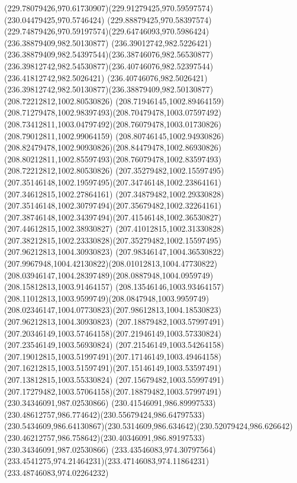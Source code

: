 {    \curveto(229.78079426,970.61730907)(229.91279425,970.59597574)(230.04479425,970.5746424)
    \curveto(229.88879425,970.58397574)(229.74879426,970.59197574)(229.64746093,970.5986424)
    \moveto(236.38879409,982.50130877)
    \curveto(236.39012742,982.5226421)(236.38879409,982.54397544)(236.38746076,982.56530877)
    \curveto(236.39812742,982.54530877)(236.40746076,982.52397544)(236.41812742,982.5026421)
    \curveto(236.40746076,982.5026421)(236.39812742,982.50130877)(236.38879409,982.50130877)
    \moveto(208.72212812,1002.80530826)
    \curveto(208.71946145,1002.89464159)(208.71279478,1002.98397493)(208.70479478,1003.07597492)
    \curveto(208.73412811,1003.04797492)(208.76079478,1003.01730826)(208.79012811,1002.99064159)
    \curveto(208.80746145,1002.94930826)(208.82479478,1002.90930826)(208.84479478,1002.86930826)
    \curveto(208.80212811,1002.85597493)(208.76079478,1002.83597493)(208.72212812,1002.80530826)
    \moveto(207.35279482,1002.15597495)
    \curveto(207.35146148,1002.19597495)(207.34746148,1002.23864161)(207.34612815,1002.27864161)
    \curveto(207.34879482,1002.29330828)(207.35146148,1002.30797494)(207.35679482,1002.32264161)
    \curveto(207.38746148,1002.34397494)(207.41546148,1002.36530827)(207.44612815,1002.38930827)
    \curveto(207.41012815,1002.31330828)(207.38212815,1002.23330828)(207.35279482,1002.15597495)
    \moveto(207.96212813,1004.30930823)
    \curveto(207.98346147,1004.36530822)(207.9967948,1004.42130822)(208.01012813,1004.47730822)
    \curveto(208.03946147,1004.28397489)(208.0887948,1004.0959749)(208.15812813,1003.91464157)
    \curveto(208.13546146,1003.93464157)(208.11012813,1003.9599749)(208.0847948,1003.9959749)
    \curveto(208.02346147,1004.07730823)(207.98612813,1004.18530823)(207.96212813,1004.30930823)
    \moveto(207.18879482,1003.57997491)
    \curveto(207.20346149,1003.57464158)(207.21946149,1003.57330824)(207.23546149,1003.56930824)
    \curveto(207.21546149,1003.54264158)(207.19012815,1003.51997491)(207.17146149,1003.49464158)
    \curveto(207.16212815,1003.51597491)(207.15146149,1003.53597491)(207.13812815,1003.55330824)
    \curveto(207.15679482,1003.55997491)(207.17279482,1003.57064158)(207.18879482,1003.57997491)
    \moveto(230.34346091,987.02530866)
    \curveto(230.41546091,986.89997533)(230.48612757,986.774642)(230.55679424,986.64797533)
    \curveto(230.5434609,986.64130867)(230.5314609,986.634642)(230.52079424,986.626642)
    \curveto(230.46212757,986.758642)(230.40346091,986.89197533)(230.34346091,987.02530866)
    \moveto(233.43546083,974.30797564)
    \curveto(233.4541275,974.21464231)(233.47146083,974.11864231)(233.48746083,974.02264232)
}
